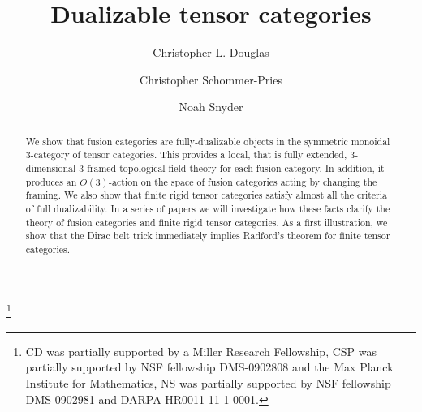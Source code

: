 \documentclass{amsart}
\begin{document}
\title{Dualizable tensor categories}

\begin{abstract}
We show that fusion categories are fully-dualizable objects in the symmetric monoidal 3-category of tensor categories.  This provides a local, that is fully extended, 3-dimensional 3-framed topological field theory for each fusion category. In addition, it produces an $O(3)$-action on the space of fusion categories acting by changing the framing. We also show that finite rigid tensor categories satisfy almost all the criteria of full dualizability.  In a series of papers we will investigate how these facts clarify the theory of fusion categories and finite rigid tensor categories.  As a first illustration, we show that the Dirac belt trick immediately implies Radford's theorem for finite tensor categories.
\end{abstract}

%
%
	
\author{Christopher L. Douglas}
\address{Mathematical Institute\\ University of Oxford\\ Oxford OX1 3LB\\ United Kingdom}
      	
\author{Christopher Schommer-Pries}
\address{Department of Mathematics\\ Massachusetts Institute of Technology\\ Cambridge, MA 02139\\ USA}

\author{Noah Snyder}
\address{Department of Mathematics\\ Columbia University\\ New York, NY 10027\\ USA}

\thanks{CD was partially supported by a Miller Research Fellowship, CSP was partially supported by NSF fellowship DMS-0902808 and the Max Planck Institute for Mathematics,  NS was partially supported by NSF fellowship DMS-0902981 and DARPA HR0011-11-1-0001.
}
\end{document}
